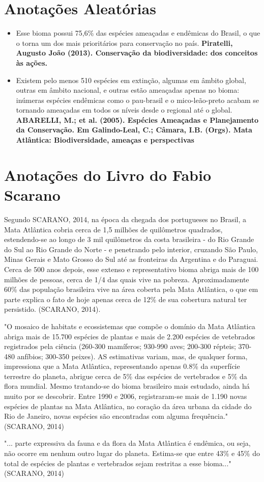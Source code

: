 \documentclass{article}
\begin{document}
\section{Anotações Aleatórias}
\begin{itemize}
    \item Esse bioma possui 75,6\% das espécies ameaçadas e endêmicas do Brasil, o que o torna um dos mais prioritários para conservação no país. \textbf{Piratelli, Augusto João (2013). Conservação da biodiversidade: dos conceitos às ações.}
    \item Existem pelo menos 510 espécies em extinção, algumas em âmbito global, outras em âmbito nacional, e outras estão ameaçadas apenas no bioma: inúmeras espécies endêmicas como o pau-brasil e o mico-leão-preto acabam se tornando ameaçadas em todos os níveis desde o regional até o global. \textbf{ABARELLI, M.; et al. (2005). Espécies Ameaçadas e Planejamento da Conservação. Em Galindo-Leal, C.; Câmara, I.B. (Orgs). Mata Atlântica: Biodiversidade, ameaças e perspectivas}
\end{itemize}

\section{Anotações do Livro do Fabio Scarano}

Segundo SCARANO, 2014, na época da chegada dos portugueses no Brasil, a Mata Atlântica cobria cerca de 1,5 milhões de quilômetros quadrados, estendendo-se ao longo de 3 mil quilômetros da costa brasileira - do Rio Grande do Sul ao Rio Grande do Norte - e penetrando pelo interior, cruzando São Paulo, Minas Gerais e Mato Grosso do Sul até as fronteiras da Argentina e do Paraguai. Cerca de 500 anos depois, esse extenso e representativo bioma abriga mais de 100 milhões de pessoas, cerca de 1/4 das quais vive na pobreza. Aproximadamente 60\% das população brasileira vive na área coberta pela Mata Atlântica, o que em parte explica o fato de hoje apenas cerca de 12\% de sua cobertura natural ter persistido. (SCARANO, 2014).

"O mosaico de habitats e ecossistemas que compõe o domínio da Mata Atlântica abriga mais de 15.700 espécies de plantas e mais de 2.200 espécies de vetebrados registrados pela ciência (260-300 mamíferos; 930-990 aves; 200-300 répteis; 370-480 anfíbios; 300-350 peixes). AS estimativas variam, mas, de qualquer forma, impressiona que a Mata Atlântica, representando apenas 0.8\% da superfície terrestre do planeta, abrigue cerca de 5\% das espécies de vertebrados e 5\% da flora mundial. Mesmo tratando-se do bioma brasileiro mais estudado, ainda há muito por se descobrir. Entre 1990 e 2006, registraram-se mais de 1.190 novas espécies de plantas na Mata Atlântica, no coração da área urbana da cidade do Rio de Janeiro, novas espécies são encontradas com alguma frequência." (SCARANO, 2014)

"... parte expressiva da fauna e da flora da Mata Atlântica é endêmica, ou seja, não ocorre em nenhum outro lugar do planeta. Estima-se que entre 43\% e 45\% do total de espécies de plantas e vertebrados sejam restritas a esse bioma..." (SCARANO, 2014)
\end{document}
